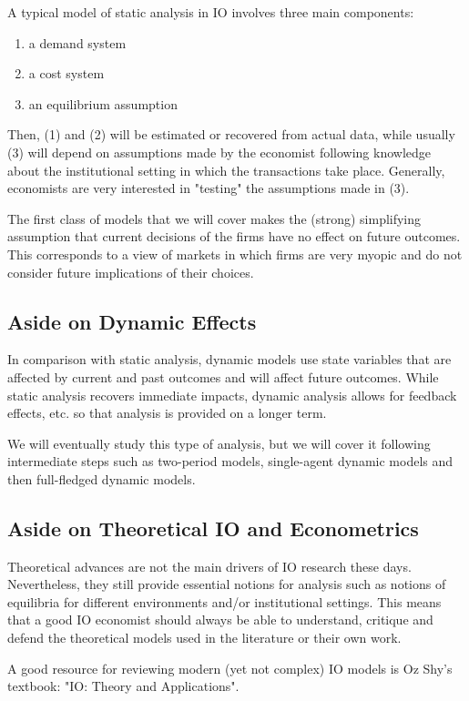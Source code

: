 \documentclass[12pt]{report}
\begin{document}
A typical model of static analysis in IO involves three main components:\begin{enumerate}
\item a demand system
\item a cost system
\item an equilibrium assumption
\end{enumerate} Then, (1) and (2) will be estimated or recovered from actual data, while usually (3) will depend on assumptions made by the economist following knowledge about the institutional setting in which the transactions take place. Generally, economists are very interested in "testing" the assumptions made in (3).

The first class of models that we will cover makes the (strong) simplifying assumption that current decisions of the firms have no effect on future outcomes. This corresponds to a view of markets in which firms are very myopic and do not consider future implications of their choices.

\subsection{Aside on Dynamic Effects}

In comparison with static analysis, dynamic models use state variables that are affected by current and past outcomes and will affect future outcomes. While static analysis recovers immediate impacts, dynamic analysis allows for feedback effects, etc. so that analysis is provided on a longer term.

We will eventually study this type of analysis, but we will cover it following intermediate steps such as two-period models, single-agent dynamic models and then full-fledged dynamic models.

\subsection{Aside on Theoretical IO and Econometrics}

Theoretical advances are not the main drivers of IO research these days. Nevertheless, they still provide essential notions for analysis such as notions of equilibria for different environments and/or institutional settings. This means that a good IO economist should always be able to understand, critique and defend the theoretical models used in the literature or their own work.

A good resource for reviewing modern (yet not complex) IO models is Oz Shy's textbook: "IO: Theory and Applications".
\end{document}
